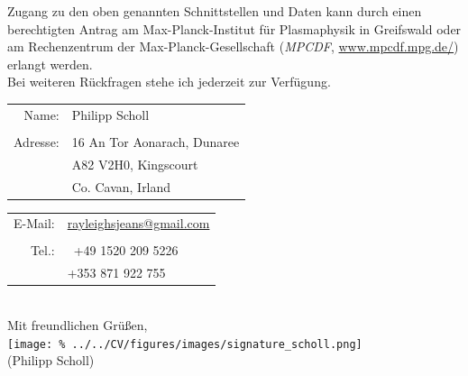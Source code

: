 \documentclass[
  fontsize=11pt,
  paper=a4,
]{report}
\begin{document}
    \vspace*{1cm}%
%
    Zugang zu den oben genannten Schnittstellen und Daten kann durch einen berechtigten Antrag am Max-Planck-Institut für Plasmaphysik in Greifswald oder am Rechenzentrum der Max-Planck-Gesellschaft (\textit{MPCDF}, \url{www.mpcdf.mpg.de/}) erlangt werden.\\[0.5cm]%
%
    Bei weiteren Rückfragen stehe ich jederzeit zur Verfügung.\\[.5cm]%
%
    \begin{minipage}{.47\textwidth}
        \begin{center}
            \def\arraystretch{1}%
            \begin{tabular}{rl}%
              Name: & Philipp Scholl \\
              & \\%
              Adresse: & %
                  16 An Tor Aonarach, Dunaree\\%
                  & A82 V2H0, Kingscourt\\%
                  & Co. Cavan, Irland%
            \end{tabular}
        \end{center}
    \end{minipage}
    \hfill%
    \begin{minipage}{.47\textwidth}
        \begin{center}
            \def\arraystretch{1}%
            \begin{tabular}{rl}%
              E-Mail: & \href{mailto:rayleighsjeans@gmail.com}{rayleighsjeans@gmail.com} \\%
              & \\%
              Tel.: & %
                  \,\,\,+49 1520 209 5226\\%
                  & +353 871 922 755%
            \end{tabular}
        \end{center}
    \end{minipage}
    \\[0.5cm]%
%
    Mit freundlichen Grüßen,\\[.5cm]%
    \texttt{[image: \%
      ../../CV/figures/images/signature\_scholl.png]}\\[-0.5cm]%
    (Philipp Scholl)%
%
\end{document}
